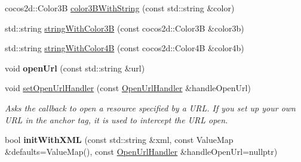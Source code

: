 \begin{DoxyCompactItemize}
\item 
cocos2d\+::\+Color3B \hyperlink{classui_1_1RichText_ad55a7556763a65d5c87e3826f3e8335b}{color3\+B\+With\+String} (const std\+::string \&color)
\item 
std\+::string \hyperlink{classui_1_1RichText_ac81e46b4a4d36f7c607803fc125721e6}{string\+With\+Color3B} (const cocos2d\+::\+Color3B \&color3b)
\item 
std\+::string \hyperlink{classui_1_1RichText_ae6ebbc92f1c67012b680ac70de932d0a}{string\+With\+Color4B} (const cocos2d\+::\+Color4B \&color4b)
\item 
\mbox{\label{classui_1_1RichText_af6721dffe38613d991f11ea159ab1e4b}} 
void {\bfseries open\+Url} (const std\+::string \&url)
\item 
void \hyperlink{classui_1_1RichText_a750e15147a256bf092a8670720548f38}{set\+Open\+Url\+Handler} (const \hyperlink{classui_1_1RichText_ad3631ae61d204f1d9576f5923bbd762e}{Open\+Url\+Handler} \&handle\+Open\+Url)
\begin{DoxyCompactList}\small\item\em Asks the callback to open a resource specified by a U\+RL.  If you set up your own U\+RL in the anchor tag, it is used to intercept the U\+RL open. \end{DoxyCompactList}\item 
\mbox{\label{classui_1_1RichText_a854a0d338833d1f4608a3f71a87e4da8}} 
bool {\bfseries init\+With\+X\+ML} (const std\+::string \&xml, const Value\+Map \&defaults=Value\+Map(), const \hyperlink{classui_1_1RichText_ad3631ae61d204f1d9576f5923bbd762e}{Open\+Url\+Handler} \&handle\+Open\+Url=nullptr)
\end{DoxyCompactItemize}
